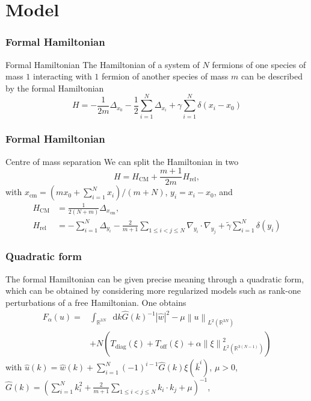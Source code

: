 \documentclass{beamer}[10]
\newcommand{\norm}[1]{\left\lVert #1 \right\rVert}
\newcommand*\diff{\mathop{}\!\mathrm{d}}
\newcommand{\R}{\mathbb{R}}
\begin{document}
\section{Model}
\begin{frame}
	\frametitle{Formal Hamiltonian}
	\begin{block}{Formal Hamiltonian}
	The Hamiltonian of a system of $ N $ fermions of one species of mass $ 1 $ interacting with $ 1 $ fermion of another species of mass $ m $ can be described by the formal Hamiltonian\begin{equation}
	H=-\frac{1}{2m}\Delta_{x_0}-\frac{1}{2}\sum_{i=1}^{N}\Delta_{x_i}+\gamma\sum_{i=1}^{N}\delta(x_i-x_0)
	\end{equation}
	\end{block}
\end{frame}
\begin{frame} 
	\frametitle{Formal Hamiltonian}
	\begin{block}{Centre of mass separation}
		We can split the Hamiltonian in two \begin{equation}
		H=H_{\text{CM}}+\frac{m+1}{2m}H_{\text{rel}},
		\end{equation}
		with $ x_{\text{cm}}=(mx_0+\sum_{i=1}^{N}x_i)/(m+N) $, $ y_i=x_i-x_0 $, and \begin{equation}\begin{aligned}
		H_\text{CM}&=\frac{1}{2(N+m)}\Delta_{x_{\text{cm}}},\\ H_{\text{rel}}&=-\sum_{i=1}^{N}\Delta_{y_i}-\frac{2}{m+1}\sum_{1\leq i<j\leq N}\nabla_{y_i}\cdot\nabla_{y_j}+\tilde{\gamma}\sum_{i=1}^{N}\delta(y_i)
		\end{aligned}
		\end{equation}
	\end{block}
\end{frame}
\begin{frame}
	\frametitle{Quadratic form}
	The formal Hamiltonian can be given precise meaning through a quadratic form, which can be obtained by considering more regularized models such as rank-one perturbations of a free Hamiltonian. One obtains\begin{equation}
	\begin{aligned}
	F_\alpha(u)=&\int_{\R^{3N}}\diff k \hat{G}(k)^{-1}|\hat{w}|^2-\mu\norm{u}_{L^2(\R^{3N})}\\&+N\left(T_{\text{diag}}(\xi)+T_{\text{off}}(\xi)+\alpha\norm{\xi}_{L^2(\R^{3(N-1)})}^2\right)
	\end{aligned}
	\end{equation} 
	with $ \hat{u}(k)=\hat{w}(k)+\sum_{i=1}^{N}(-1)^{i-1}\hat{G}(k)\xi(\bar{k}^i) $, $ \mu>0 $, $ \hat{G}(k)=\left(\sum_{i=1}^{N}k_i^2+\frac{2}{m+1}\sum_{1\leq i<j\leq N}k_i\cdot k_j+\mu\right)^{-1} $,
\end{frame}
\end{document}
